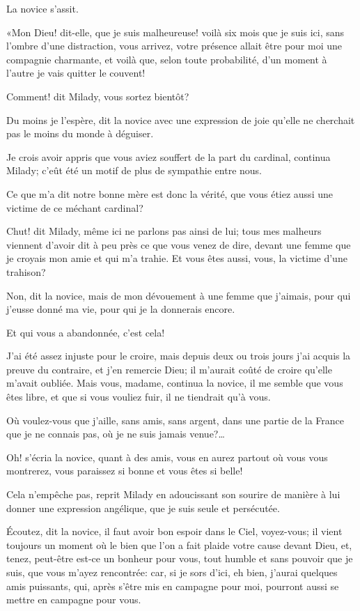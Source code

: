 La novice s'assit. 

«Mon Dieu! dit-elle, que je suis malheureuse! voilà six mois que je suis ici, sans l'ombre d'une distraction, vous arrivez, votre présence allait être pour moi une compagnie charmante, et voilà que, selon toute probabilité, d'un moment à l'autre je vais quitter le couvent! 

\speak  Comment! dit Milady, vous sortez bientôt? 

\speak  Du moins je l'espère, dit la novice avec une expression de joie qu'elle ne cherchait pas le moins du monde à déguiser. 

\speak  Je crois avoir appris que vous aviez souffert de la part du cardinal, continua Milady; c'eût été un motif de plus de sympathie entre nous. 

\speak  Ce que m'a dit notre bonne mère est donc la vérité, que vous étiez aussi une victime de ce méchant cardinal? 

\speak  Chut! dit Milady, même ici ne parlons pas ainsi de lui; tous mes malheurs viennent d'avoir dit à peu près ce que vous venez de dire, devant une femme que je croyais mon amie et qui m'a trahie. Et vous êtes aussi, vous, la victime d'une trahison? 

\speak  Non, dit la novice, mais de mon dévouement à une femme que j'aimais, pour qui j'eusse donné ma vie, pour qui je la donnerais encore. 

\speak  Et qui vous a abandonnée, c'est cela! 

\speak  J'ai été assez injuste pour le croire, mais depuis deux ou trois jours j'ai acquis la preuve du contraire, et j'en remercie Dieu; il m'aurait coûté de croire qu'elle m'avait oubliée. Mais vous, madame, continua la novice, il me semble que vous êtes libre, et que si vous vouliez fuir, il ne tiendrait qu'à vous. 

\speak  Où voulez-vous que j'aille, sans amis, sans argent, dans une partie de la France que je ne connais pas, où je ne suis jamais venue?\dots 

\speak  Oh! s'écria la novice, quant à des amis, vous en aurez partout où vous vous montrerez, vous paraissez si bonne et vous êtes si belle! 

\speak  Cela n'empêche pas, reprit Milady en adoucissant son sourire de manière à lui donner une expression angélique, que je suis seule et persécutée. 

\speak  Écoutez, dit la novice, il faut avoir bon espoir dans le Ciel, voyez-vous; il vient toujours un moment où le bien que l'on a fait plaide votre cause devant Dieu, et, tenez, peut-être est-ce un bonheur pour vous, tout humble et sans pouvoir que je suis, que vous m'ayez rencontrée: car, si je sors d'ici, eh bien, j'aurai quelques amis puissants, qui, après s'être mis en campagne pour moi, pourront aussi se mettre en campagne pour vous. 

